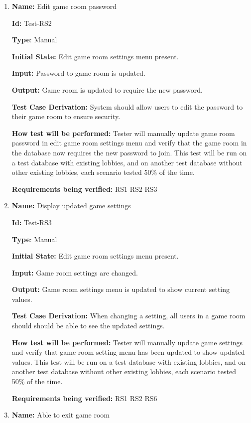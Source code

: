 \documentclass[12pt, titlepage]{article}
\begin{document}
\begin{enumerate}
\item{\textbf{Name:} Edit game room password} \label{itm:Test-RS2}

\textbf{Id:} Test-RS2

\textbf{Type}: Manual

\textbf{Initial State:} Edit game room settings menu present.

\textbf{Input:} Password to game room is updated.

\textbf{Output:} Game room is updated to require the new password.

\textbf{Test Case Derivation:} System should allow users to edit the password to their game room to ensure security.

\textbf{How test will be performed:} Tester will manually update game room password in edit game room settings menu and verify that the game room in the database now requires the new password to join. This test will be run on a test database with existing lobbies, and on another test database without other existing lobbies, each scenario tested 50\% of the time.

\textbf{Requirements being verified: } RS1 RS2 RS3

\item{\textbf{Name:} Display updated game settings} \label{itm:Test-RS3}

\textbf{Id:} Test-RS3

\textbf{Type}: Manual

\textbf{Initial State:} Edit game room settings menu present.

\textbf{Input:} Game room settings are changed.

\textbf{Output:} Game room settings menu is updated to show current setting values.

\textbf{Test Case Derivation:} When changing a setting, all users in a game room should should be able to see the updated settings.

\textbf{How test will be performed:} Tester will manually update game settings and verify that game room setting menu has been updated to show updated values. This test will be run on a test database with existing lobbies, and on another test database without other existing lobbies, each scenario tested 50\% of the time.

\textbf{Requirements being verified: } RS1 RS2 RS6

\item{\textbf{Name:} Able to exit game room} \label{itm:Test-ER1}


\end{enumerate}
\end{document}
